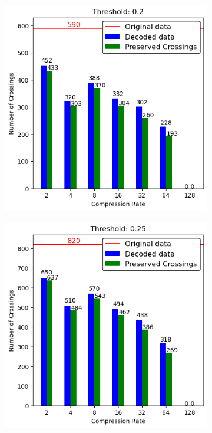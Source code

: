 \begin{appendices}
\begin{figure}[]
\begin{subfigure}{.5\textwidth}
		\end{subfigure}
		\hfill
		\begin{subfigure}{.5\textwidth}
			\includegraphics[width=\textwidth]{../../Images/spikes_threshold_02.png}
		\end{subfigure}
		\begin{subfigure}{.5\textwidth}
			\includegraphics[width=\textwidth]{../../Images/spikes_threshold_025.png}
		\end{subfigure}
	\end{figure}


\end{appendices}
